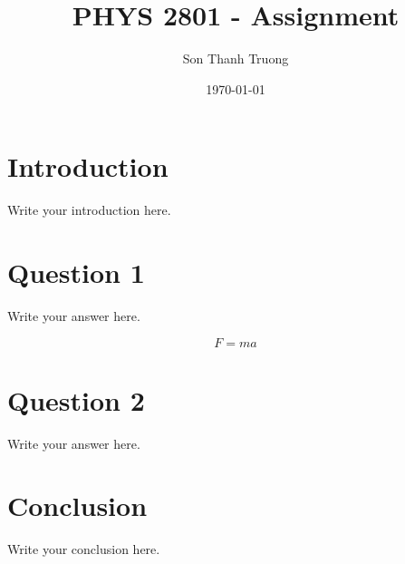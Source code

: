 \documentclass[12pt,letterpaper]{article}
\title{PHYS 2801 - Assignment}
\author{Son Thanh Truong}
\date{\today}
\begin{document}
\maketitle

\section{Introduction}

Write your introduction here.

\section{Question 1}

Write your answer here.

\begin{equation}
    F = ma
    \label{eq:newton}
\end{equation}

\section{Question 2}

Write your answer here.

%

\section{Conclusion}

Write your conclusion here.


\end{document}
